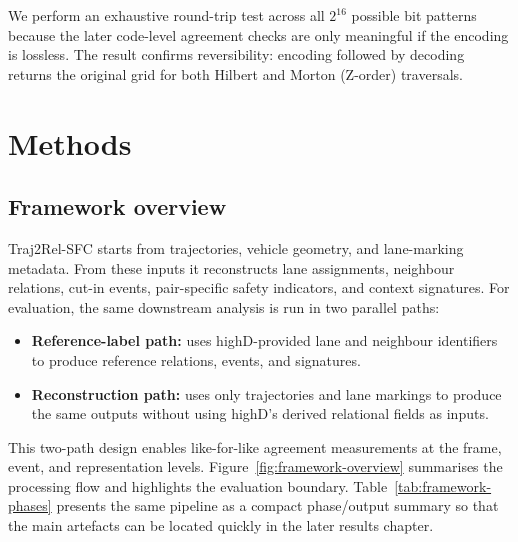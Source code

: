 \documentclass[12pt,a4paper,twoside,openright]{report}
\newcommand{\FrameworkName}{Traj2Rel-SFC}
\begin{document}
    We perform an exhaustive round-trip test across all $2^{16}$ possible bit patterns because the later code-level agreement checks are only meaningful if the encoding is lossless. The result confirms reversibility: encoding followed by decoding returns the original grid for both Hilbert and Morton (Z-order) traversals.

    \chapter{Methods}
    \label{chap:methods}

    \section{Framework overview}
    \FrameworkName{} starts from trajectories, vehicle geometry, and lane-marking metadata. From these inputs it reconstructs lane assignments, neighbour relations, cut-in events, pair-specific safety indicators, and context signatures. For evaluation, the same downstream analysis is run in two parallel paths:

    \begin{itemize}[leftmargin=1.2em]
  \item \textbf{Reference-label path:} uses highD-provided lane and neighbour identifiers to produce reference relations, events, and signatures.
  \item \textbf{Reconstruction path:} uses only trajectories and lane markings to produce the same outputs without using highD's derived relational fields as inputs.
    \end{itemize}

    This two-path design enables like-for-like agreement measurements at the frame, event, and representation levels. Figure~\ref{fig:framework-overview} summarises the processing flow and highlights the evaluation boundary. Table~\ref{tab:framework-phases} presents the same pipeline as a compact phase/output summary so that the main artefacts can be located quickly in the later results chapter.
\end{document}

